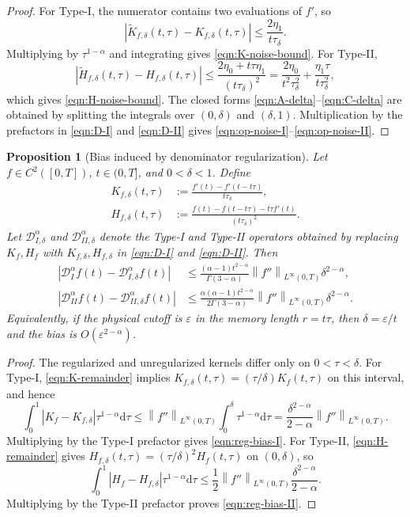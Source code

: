 \documentclass[preprint,3p,times]{elsarticle}
\newcommand{\norm}[1]{\left\lVert #1\right\rVert}
\newcommand{\abs}[1]{\left\lvert #1\right\rvert}
\newtheorem{proposition}{Proposition}[section]
\def\d{\mathrm{d}}
\begin{document}
\begin{proof}
For Type-I, the numerator contains two evaluations of $f'$, so
\[
    \abs{\widetilde K_{f,\delta}(t,\tau)-K_{f,\delta}(t,\tau)}
    \le \frac{2\eta_1}{t\tau_\delta}.
\]
Multiplying by $\tau^{1-\alpha}$ and integrating gives \eqref{eqn:K-noise-bound}. For Type-II,
\[
\abs{\widetilde H_{f,\delta}(t,\tau)-H_{f,\delta}(t,\tau)}
\le\frac{2\eta_0+t\tau\eta_1}{(t\tau_\delta)^2}
=\frac{2\eta_0}{t^2\tau_\delta^2}+\frac{\eta_1\tau}{t\tau_\delta^2},
\]
which gives \eqref{eqn:H-noise-bound}. The closed forms \eqref{eqn:A-delta}--\eqref{eqn:C-delta} are obtained by splitting the integrals over $(0,\delta)$ and $(\delta,1)$. Multiplication by the prefactors in \eqref{eqn:D-I} and \eqref{eqn:D-II} gives \eqref{eqn:op-noise-I}--\eqref{eqn:op-noise-II}.
\end{proof}

\begin{proposition}[Bias induced by denominator regularization]
\label{prop:regularization-bias}
Let $f\in C^2([0,T])$, $t\in(0,T]$, and $0<\delta<1$. Define
\begin{align}
    K_{f,\delta}(t,\tau)
    &:=\frac{f'(t)-f'(t-t\tau)}{t\tau_\delta},\label{eqn:K-delta}\\
    H_{f,\delta}(t,\tau)
    &:=\frac{f(t)-f(t-t\tau)-t\tau f'(t)}{(t\tau_\delta)^2}.\label{eqn:H-delta}
\end{align}
Let $\mathcal D_{I,\delta}^{\alpha}$ and $\mathcal D_{II,\delta}^{\alpha}$ denote the Type-I and Type-II operators obtained by replacing $K_f,H_f$ with $K_{f,\delta},H_{f,\delta}$ in \eqref{eqn:D-I} and \eqref{eqn:D-II}. Then
\begin{align}
\abs{\mathcal D_I^\alpha f(t)-\mathcal D_{I,\delta}^{\alpha}f(t)}
&\le
\frac{(\alpha-1)t^{2-\alpha}}{\Gamma(3-\alpha)}
\norm{f''}_{L^\infty(0,T)}\delta^{2-\alpha},\label{eqn:reg-bias-I}\\
\abs{\mathcal D_{II}^\alpha f(t)-\mathcal D_{II,\delta}^{\alpha}f(t)}
&\le
\frac{\alpha(\alpha-1)t^{2-\alpha}}{2\Gamma(3-\alpha)}
\norm{f''}_{L^\infty(0,T)}\delta^{2-\alpha}.\label{eqn:reg-bias-II}
\end{align}
Equivalently, if the physical cutoff is $\varepsilon$ in the memory length $r=t\tau$, then $\delta=\varepsilon/t$ and the bias is $O(\varepsilon^{2-\alpha})$.
\end{proposition}

\begin{proof}
The regularized and unregularized kernels differ only on $0<\tau<\delta$. For Type-I, \eqref{eqn:K-remainder} implies $K_{f,\delta}(t,\tau)=(\tau/\delta)K_f(t,\tau)$ on this interval, and hence
\[
    \int_0^1\abs{K_f-K_{f,\delta}}\tau^{1-\alpha}\d\tau
    \le\norm{f''}_{L^\infty(0,T)}\int_0^\delta\tau^{1-\alpha}\d\tau
    =\frac{\delta^{2-\alpha}}{2-\alpha}\norm{f''}_{L^\infty(0,T)}.
\]
Multiplying by the Type-I prefactor gives \eqref{eqn:reg-bias-I}. For Type-II, \eqref{eqn:H-remainder} gives $H_{f,\delta}(t,\tau)=(\tau/\delta)^2H_f(t,\tau)$ on $(0,\delta)$, so
\[
    \int_0^1\abs{H_f-H_{f,\delta}}\tau^{1-\alpha}\d\tau
    \le\frac{1}{2}\norm{f''}_{L^\infty(0,T)}\frac{\delta^{2-\alpha}}{2-\alpha}.
\]
Multiplying by the Type-II prefactor proves \eqref{eqn:reg-bias-II}.
\end{proof}
\end{document}
